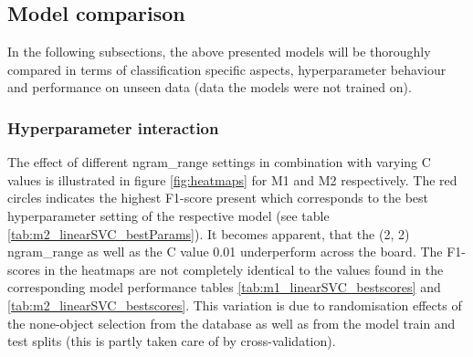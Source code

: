 \subsection{Model comparison}
In the following subsections, the above presented models will be thoroughly compared in terms of classification specific aspects, hyperparameter behaviour and performance on unseen data (data the models were not trained on). 

\subsubsection{Hyperparameter interaction}
The effect of different ngram\_range settings in combination with varying C values is illustrated in figure \ref{fig:heatmaps} for M1 and M2 respectively. The red circles indicates the highest F1-score present which corresponds to the best hyperparameter setting of the respective model (see table \ref{tab:m2_linearSVC_bestParams}). It becomes apparent, that the (2, 2) ngram\_range as well as the C value 0.01 underperform across the board. The F1-scores in the heatmaps are not completely identical to the values found in the corresponding model performance tables \ref{tab:m1_linearSVC_bestscores} and \ref{tab:m2_linearSVC_bestscores}. This variation is due to randomisation effects of the none-object selection from the database as well as from the model train and test splits (this is partly taken care of by cross-validation).\\

